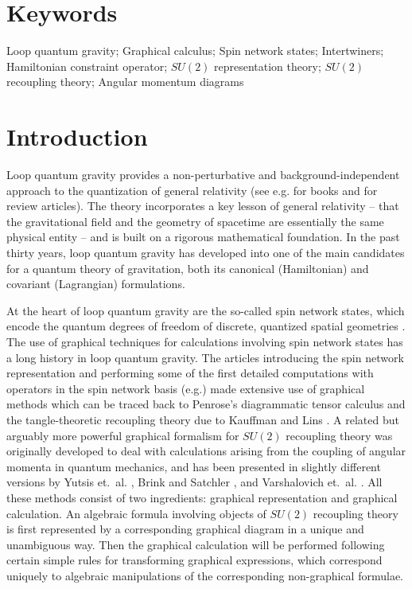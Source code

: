 \documentclass[graybox, secnum]{svmult}
\makeatletter
\newcommand{\eg}{e.g.\@\xspace}
\makeatother
\begin{document}
\section*{Keywords} 


Loop quantum gravity; Graphical calculus; Spin network states; Intertwiners; Hamiltonian constraint operator; $SU(2)$ representation theory; $SU(2)$ recoupling theory; Angular momentum diagrams

\section{Introduction}

Loop quantum gravity provides a non-perturbative and background-independent approach to the quantization of general relativity (see \eg \cite{Ashtekar:2017,Rovelli:2004tv,Rovelli:2014,Thiemann:2007pyv} for books and \cite{Thiemann:2002nj,Ashtekar:2004eh,Han:2005km,Giesel:2012ws,Baez:1999sr,Rovelli:2011eq,Perez:2012wv} for review articles). The theory incorporates a key lesson of general relativity -- that the gravitational field and the geometry of spacetime are essentially the same physical entity -- and is built on a rigorous mathematical foundation. In the past thirty years, loop quantum gravity has developed into one of the main candidates for a quantum theory of gravitation, both its canonical (Hamiltonian) and covariant (Lagrangian) formulations.

At the heart of loop quantum gravity are the so-called spin network states, which encode the quantum degrees of freedom of discrete, quantized spatial geometries \cite{Rovelli:1994ge, Rovelli:1995}. The use of graphical techniques for calculations involving spin network states has a long history in loop quantum gravity. The articles introducing the spin network representation \cite{Rovelli:1994ge, Rovelli:1995} and performing some of the first detailed computations with operators in the spin network basis (\eg \cite{Borissov:1997ji, DePietri:1996tvo}) made extensive use of graphical methods which can be traced back to Penrose's diagrammatic tensor calculus \cite{Penrose} and the tangle-theoretic recoupling theory due to Kauffman and Lins \cite{Kauffman}. A related but arguably more powerful graphical formalism for $SU(2)$ recoupling theory was originally developed to deal with calculations arising from the coupling of angular momenta in quantum mechanics, and has been presented in slightly different versions by Yutsis et.~al. \cite{Yutsis:1962bk}, Brink and Satchler \cite{brink1968angular}, and Varshalovich et.~al. \cite{Varshalovich:1988ye}. All these methods consist of two ingredients: graphical representation and graphical calculation. An algebraic formula involving objects of $SU(2)$ recoupling theory is first represented by a corresponding graphical diagram in a unique and unambiguous way. Then the graphical calculation will be performed following certain simple rules for transforming graphical expressions, which correspond uniquely to algebraic manipulations of the corresponding non-graphical formulae.
\end{document}

